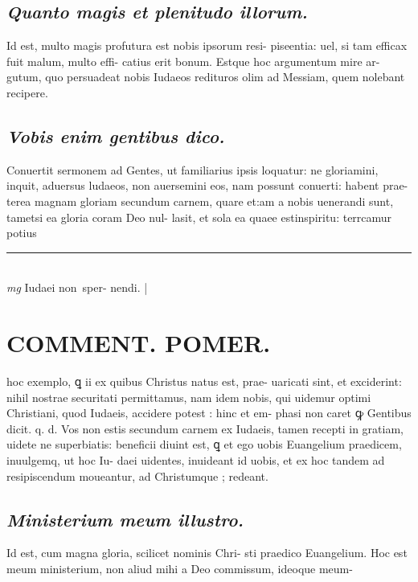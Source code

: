 \documentclass{article}
\begin{document}
\begin{pages}
\subsection*{\textit{Quanto magis et plenitudo illorum. }}\pstart Id est, multo magis profutura est nobis ipsorum resi- piseentia: uel, si tam efficax fuit malum, multo effi- catius erit bonum. Estque hoc argumentum mire ar- gutum, quo persuadeat nobis Iudaeos redituros olim ad Messiam, quem nolebant recipere.  \pend
{}
{}
\subsection*{\textit{Vobis enim gentibus dico. }}\pstart Conuertit sermonem ad Gentes, ut familiarius ipsis loquatur: ne gloriamini, inquit, aduersus ludaeos, non auersemini eos, nam possunt conuerti: habent prae- terea magnam gloriam secundum carnem, quare et:am a nobis uenerandi sunt, tametsi ea gloria coram Deo nul- lasit, et sola ea quaee estinspiritu: terrcamur potius  \pend
\vspace{0.5cm}\noindent
\vspace{0.2cm}\rule{1cm}{0.2pt}\\ 
\hspace{0.2cm}\textit{mg}
\footnotesize Iudaei non sper- nendi.  
\normalsize| 
\section*{COMMENT. POMER.  }\pstart hoc exemplo, ꝗ ii ex quibus Christus natus est, prae- uaricati sint, et exciderint: nihil nostrae securitati permittamus, nam idem nobis, qui uidemur optimi Christiani, quod Iudaeis, accidere potest : hinc et em- phasi non caret ꝙ Gentibus dicit. q. d. Vos non estis secundum carnem ex Iudaeis, tamen recepti in gratiam, uidete ne superbiatis: beneficii diuint est, ꝗ et ego uobis Euangelium praedicem, inuulgemq, ut hoc Iu- daei uidentes, inuideant id uobis, et ex hoc tandem ad resipiscendum moueantur, ad Christumque ; redeant.  \pend
{}
{}
\subsection*{\textit{Ministerium meum illustro. }}\pstart Id est, cum magna gloria, scilicet nominis Chri- sti praedico Euangelium. Hoc est meum ministerium, non aliud mihi a Deo commissum, ideoque meum-  \pend
{}
{}

\end{pages}
\end{document}
